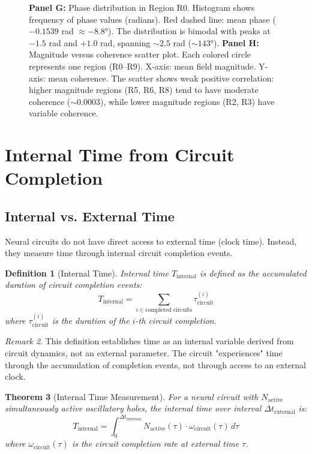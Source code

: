 \documentclass[aps,prd,twocolumn,superscriptaddress,floatfix,nofootinbib]{revtex4-2}
\newtheorem{theorem}{Theorem}[section]
\newtheorem{definition}[theorem]{Definition}
\theoremstyle{remark}
\newtheorem{remark}[theorem]{Remark}
\begin{document}
\begin{figure}[!htbp]
{\textbf{Panel G:} Phase distribution in Region R0. Histogram shows frequency of phase values (radians). Red dashed line: mean phase ($-0.1539$ rad $\approx -8.8°$). The distribution is bimodal with peaks at $-1.5$ rad and $+1.0$ rad, spanning $\sim 2.5$ rad ($\sim 143°$). 
\textbf{Panel H:} Magnitude versus coherence scatter plot. Each colored circle represents one region (R0--R9). X-axis: mean field magnitude. Y-axis: mean coherence. The scatter shows weak positive correlation: higher magnitude regions (R5, R6, R8) tend to have moderate coherence ($\sim 0.0003$), while lower magnitude regions (R2, R3) have variable coherence. }
\label{fig:coherence_fields}
\end{figure}

\section{Internal Time from Circuit Completion}
\label{sec:time}

\subsection{Internal vs. External Time}

Neural circuits do not have direct access to external time (clock time). Instead, they measure time through internal circuit completion events.

\begin{definition}[Internal Time]
\label{def:internal_time}
Internal time $T_{\text{internal}}$ is defined as the accumulated duration of circuit completion events:
\begin{equation}
T_{\text{internal}} = \sum_{i \in \text{completed circuits}} \tau_{\text{circuit}}^{(i)}
\end{equation}
where $\tau_{\text{circuit}}^{(i)}$ is the duration of the $i$-th circuit completion.
\end{definition}

\begin{remark}
This definition establishes time as an internal variable derived from circuit dynamics, not an external parameter. The circuit "experiences" time through the accumulation of completion events, not through access to an external clock.
\end{remark}

\begin{theorem}[Internal Time Measurement]
\label{thm:internal_time}
For a neural circuit with $N_{\text{active}}$ simultaneously active oscillatory holes, the internal time over interval $\Delta t_{\text{external}}$ is:
\begin{equation}
T_{\text{internal}} = \int_0^{\Delta t_{\text{external}}} N_{\text{active}}(\tau) \cdot \omega_{\text{circuit}}(\tau) \, d\tau
\end{equation}
where $\omega_{\text{circuit}}(\tau)$ is the circuit completion rate at external time $\tau$.
\end{theorem}
\end{document}

